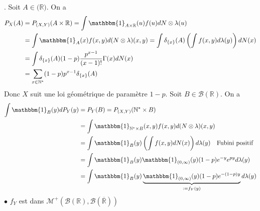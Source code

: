 \documentclass{report}
\begin{document}
\subsection{} \noindent{}\\ 
\\ 
\\
. Soit $A\in \mathcal (\mathbb R)$. On a $$\begin{aligned}
P_X(A) &= P_{(X,Y)}(A \times \mathbb R) = \int \mathbbm{1}_{A\times \mathbb R}(u) f(u) dN\otimes \lambda(u) \\
&= \int \mathbbm{1}_{A} (x) f(x,y) d(N\otimes \lambda)(x,y) = \int \delta_{\{x\}}(A) \left(\int f(x,y) d\lambda(y) \right)dN(x)\\
&= \int \delta_{\{x\}}(A) (1-p)\frac{p^{x-1}}{(x-1)!}\Gamma(x) dN(x)\\
&= \sum_{x\in \mathbb N^*} (1-p) p^{x-1} \delta_{\{x\}}(A)
\end{aligned}$$
Donc $X$ suit une loi géométrique de paramètre $1-p$.\newline
Soit $B\in \mathcal B(\mathbb R)$. On a 
$$\begin{aligned}\int \mathbbm{1}_{B }(y) dP_Y(y) &= P_Y(B) = P_{(X,Y)}(\mathbb N^* \times B)\\
&= \int \mathbbm{1}_{\mathbb N^* \times B}(x,y) f(x,y) d(N\otimes \lambda)(x,y) \\
&= \int \mathbbm{1}_{ B}(y) \left(\int f(x,y) dN(x) \right)d\lambda(y) \quad \text{Fubini positif}\\
&= \int \mathbbm{1}_{ B}(y) \mathbbm{1}_{(0,\infty)}(y) (1-p) e^{-y} e^{py}d\lambda(y) \\
&= \int \mathbbm{1}_{ B}(y) \underbrace{\mathbbm{1}_{(0,\infty)}(y) (1-p) e^{-(1-p)y}}_{:=f_Y(y)}d\lambda(y)\end{aligned}$$
$\bullet$ $f_Y$ est dans $\mathcal M^+(\mathcal B(\mathbb R),\mathcal B(\overline{\mathbb R}))$ \newline 
\end{document}
